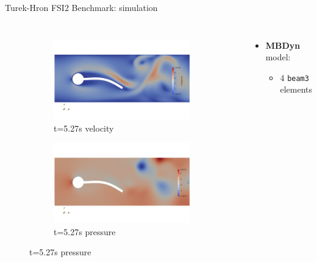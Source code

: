 \documentclass[10pt,t]{beamer}
\begin{document}
\begin{frame}{Turek-Hron FSI2 Benchmark: simulation}
\begin{columns}
\begin{figure}[htb]
\begin{subfigure}{0.5\textwidth}
  \includegraphics[width=\linewidth, trim=0 120 0 120, clip]{images/FSI2/fsi2_v3.png}
  \caption{t=5.27s velocity}
  \label{fig:fsi2_v3}
\end{subfigure}\hfil %
\begin{subfigure}{0.5\textwidth}
  \includegraphics[width=\linewidth, trim=0 120 0 120, clip]{images/FSI2/fsi2_p3.png}
  \caption{t=5.27s pressure}
  \label{fig:fsi2_p3}
\end{subfigure}\hfil %

\label{fig:FSI2_sol}
\end{figure}


\footnotesize
\begin{itemize}
\footnotesize
    \itemsep 10pt
    \item \textbf{MBDyn} model:
    \begin{itemize}
        \item 4 \texttt{beam3} elements 
    \end{itemize}
    

\end{itemize}
\end{columns}
\end{frame}
\end{document}

